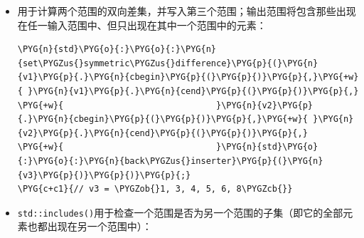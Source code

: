 \begin{itemize}

\item {}用于计算两个范围的双向差集，并写入第三个范围；输出范围将包含那些出现在任一输入范围中、但只出现在其中一个范围中的元素：



\begin{codeblockbg}
\begin{Verbatim}[commandchars=\\\{\},breaklines=true,breakanywhere=true,fontsize=\codefont,xleftmargin=17bp]
\PYG{n}{std}\PYG{o}{:}\PYG{o}{:}\PYG{n}{set\PYGZus{}symmetric\PYGZus{}difference}\PYG{p}{(}\PYG{n}{v1}\PYG{p}{.}\PYG{n}{cbegin}\PYG{p}{(}\PYG{p}{)}\PYG{p}{,}\PYG{+w}{ }\PYG{n}{v1}\PYG{p}{.}\PYG{n}{cend}\PYG{p}{(}\PYG{p}{)}\PYG{p}{,}
\PYG{+w}{                              }\PYG{n}{v2}\PYG{p}{.}\PYG{n}{cbegin}\PYG{p}{(}\PYG{p}{)}\PYG{p}{,}\PYG{+w}{ }\PYG{n}{v2}\PYG{p}{.}\PYG{n}{cend}\PYG{p}{(}\PYG{p}{)}\PYG{p}{,}
\PYG{+w}{                              }\PYG{n}{std}\PYG{o}{:}\PYG{o}{:}\PYG{n}{back\PYGZus{}inserter}\PYG{p}{(}\PYG{n}{v3}\PYG{p}{)}\PYG{p}{)}\PYG{p}{;}
\PYG{c+c1}{// v3 = \PYGZob{}1, 3, 4, 5, 6, 8\PYGZcb{}}
\end{Verbatim}
\end{codeblockbg}



\item \texttt{std::\allowbreak{}includes()}用于检查一个范围是否为另一个范围的子集（即它的全部元素也都出现在另一个范围中）：




\end{itemize}
